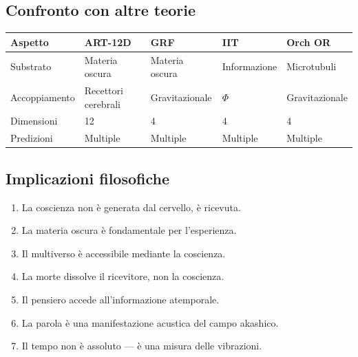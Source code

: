 \documentclass[11pt,a4paper]{article}
\begin{document}
\subsection{Confronto con altre teorie}
\begin{table}[H]
\centering
\begin{tabular}{@{}lllll@{}}
\toprule
\textbf{Aspetto} & \textbf{ART-12D} & \textbf{GRF} & \textbf{IIT} & \textbf{Orch OR} \\ \midrule
Substrato & Materia oscura & Materia oscura & Informazione & Microtubuli \\
Accoppiamento & Recettori cerebrali & Gravitazionale & $\Phi$ & Gravitazionale \\
Dimensioni & 12 & 4 & 4 & 4 \\
Predizioni & Multiple & Multiple & Multiple & Multiple \\ \bottomrule
\end{tabular}
\end{table}

\subsection{Implicazioni filosofiche}
\begin{enumerate}
    \item La coscienza non è generata dal cervello, è ricevuta.
    \item La materia oscura è fondamentale per l'esperienza.
    \item Il multiverso è accessibile mediante la coscienza.
    \item La morte dissolve il ricevitore, non la coscienza.
    \item Il pensiero accede all'informazione atemporale.
    \item La parola è una manifestazione acustica del campo akashico.
    \item Il tempo non è assoluto --- è una misura delle vibrazioni.
\end{enumerate}
\end{document}
